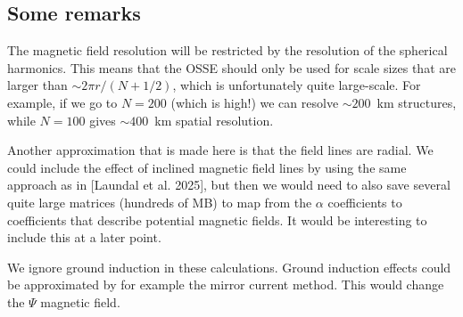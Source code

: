 \documentclass[]{article}
\begin{document}
\subsection*{Some remarks}
The magnetic field resolution will be restricted by the resolution of the spherical harmonics. This means that the OSSE should only be used for scale sizes that are larger than $\sim 2\pi r/(N + 1/2)$, which is unfortunately quite large-scale. For example, if we go to $N=200$ (which is high!) we can resolve $\sim 200$~km structures, while $N=100$ gives $\sim 400$~km spatial resolution. 

Another approximation that is made here is that the field lines are radial. We could include the effect of inclined magnetic field lines by using the same approach as in [Laundal et al. 2025], but then we would need to also save several quite large matrices (hundreds of MB) to map from the $\alpha$ coefficients to coefficients that describe potential magnetic fields. It would be interesting to include this at a later point.

We ignore ground induction in these calculations. Ground induction effects could be approximated by for example the mirror current method. This would change the $\Psi$ magnetic field. 
\end{document}

